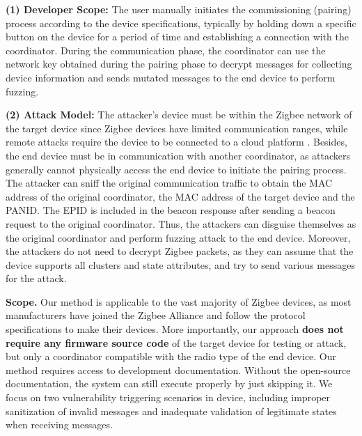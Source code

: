 \documentclass[10pt,journal,compsoc]{IEEEtran}
\begin{document}

\textbf{(1) Developer Scope:} The user manually initiates the commissioning (pairing) process according to the device specifications, typically by holding down a specific button on the device for a period of time and establishing a connection with the coordinator. During the communication phase, the coordinator can use the network key obtained during the pairing phase to decrypt messages for collecting device information and sends mutated messages to the end device to perform fuzzing. \vspace{0.1cm}

\textbf{(2) Attack Model:} The attacker’s device must be within the Zigbee network of the target device since Zigbee devices have limited communication ranges, while remote attacks require the device to be connected to a cloud platform \cite{liu2024riotfuzzer}. Besides, the end device must be in communication with another coordinator, as attackers generally cannot physically access the end device to initiate the pairing process. The attacker can sniff the original communication traffic to obtain the MAC address of the original coordinator, the MAC address of the target device and the PANID. The EPID is included in the beacon response after sending a beacon request to the original coordinator. Thus, the attackers can disguise themselves as the original coordinator and perform fuzzing attack to the end device. Moreover, the attackers do not need to decrypt Zigbee packets, as they can assume that the device supports all clusters and state attributes, and try to send various messages for the attack.\vspace{0.1cm}

\textbf{Scope.} Our method is applicable to the vast majority of Zigbee devices, as most manufacturers have joined the Zigbee Alliance and follow the protocol specifications to make their devices. More importantly, our approach \textbf{does not require any firmware source code} of the target device for testing or attack, but only a coordinator compatible with the radio type of the end device. Our method requires access to development documentation. Without the open-source documentation, the system can still execute properly by just skipping it. We focus on two vulnerability triggering scenarios in device, including improper sanitization of invalid messages and inadequate validation of legitimate states when receiving messages.
\end{document}
